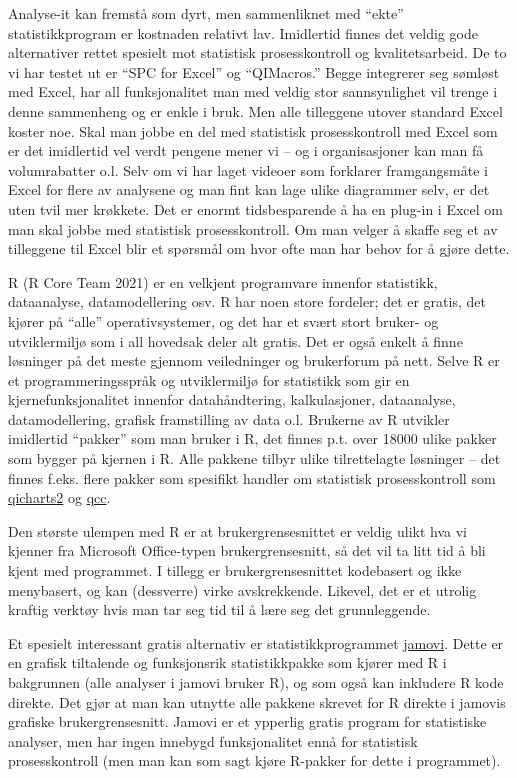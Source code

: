 \documentclass[
]{book}
\begin{document}
Analyse-it kan fremstå som dyrt, men sammenliknet med ``ekte'' statistikkprogram er kostnaden relativt lav. Imidlertid finnes det veldig gode alternativer rettet spesielt mot statistisk prosesskontroll og kvalitetsarbeid. De to vi har testet ut er ``SPC for Excel'' og ``QIMacros.'' Begge integrerer seg sømløst med Excel, har all funksjonalitet man med veldig stor sannsynlighet vil trenge i denne sammenheng og er enkle i bruk. Men alle tilleggene utover standard Excel koster noe. Skal man jobbe en del med statistisk prosesskontroll med Excel som er det imidlertid vel verdt pengene mener vi -- og i organisasjoner kan man få volumrabatter o.l. Selv om vi har laget videoer som forklarer framgangsmåte i Excel for flere av analysene og man fint kan lage ulike diagrammer selv, er det uten tvil mer krøkkete. Det er enormt tidsbesparende å ha en plug-in i Excel om man skal jobbe med statistisk prosesskontroll. Om man velger å skaffe seg et av tilleggene til Excel blir et spørsmål om hvor ofte man har behov for å gjøre dette.

R (R Core Team 2021) er en velkjent programvare innenfor statistikk, dataanalyse, datamodellering osv. R har noen store fordeler; det er gratis, det kjører på ``alle'' operativsystemer, og det har et svært stort bruker- og utviklermiljø som i all hovedsak deler alt gratis. Det er også enkelt å finne løsninger på det meste gjennom veiledninger og brukerforum på nett. Selve R er et programmeringsspråk og utviklermiljø for statistikk som gir en kjernefunksjonalitet innenfor datahåndtering, kalkulasjoner, dataanalyse, datamodellering, grafisk framstilling av data o.l. Brukerne av R utvikler imidlertid ``pakker'' som man bruker i R, det finnes p.t. over 18000 ulike pakker som bygger på kjernen i R. Alle pakkene tilbyr ulike tilrettelagte løsninger -- det finnes f.eks. flere pakker som spesifikt handler om statistisk prosesskontroll som \href{https://anhoej.github.io/qicharts2/}{qicharts2} og \href{https://luca-scr.github.io/qcc/articles/qcc.html}{qcc}.

Den største ulempen med R er at brukergrensesnittet er veldig ulikt hva vi kjenner fra Microsoft Office-typen brukergrensesnitt, så det vil ta litt tid å bli kjent med programmet. I tillegg er brukergrensesnittet kodebasert og ikke menybasert, og kan (dessverre) virke avskrekkende. Likevel, det er et utrolig kraftig verktøy hvis man tar seg tid til å lære seg det grunnleggende.

Et spesielt interessant gratis alternativ er statistikkprogrammet \href{https://www.jamovi.org/}{jamovi}. Dette er en grafisk tiltalende og funksjonsrik statistikkpakke som kjører med R i bakgrunnen (alle analyser i jamovi bruker R), og som også kan inkludere R kode direkte. Det gjør at man kan utnytte alle pakkene skrevet for R direkte i jamovis grafiske brukergrensesnitt. Jamovi er et ypperlig gratis program for statistiske analyser, men har ingen innebygd funksjonalitet ennå for statistisk prosesskontroll (men man kan som sagt kjøre R-pakker for dette i programmet).
\end{document}
